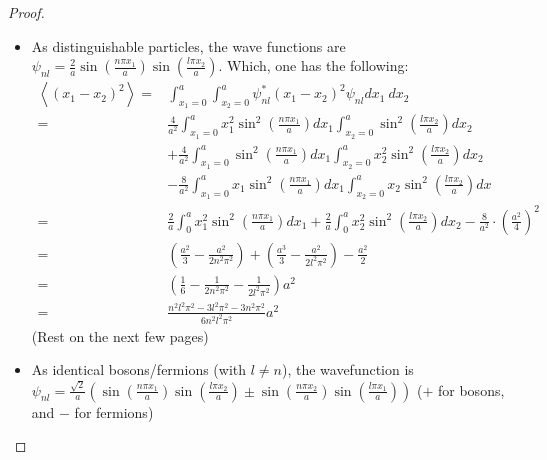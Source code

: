 \documentclass{article}
\begin{document}
\begin{proof}

    \hfil

    \begin{itemize}
        \item[(a)] As distinguishable particles, the wave functions are $\psi_{nl} = \frac{2}{a}\sin\left(\frac{n\pi x_1}{a}\right)\sin\left(\frac{l\pi x_2}{a}\right)$. Which, one has the following:
        \begin{align}
            \left<(x_1-x_2)^2\right> =& \int_{x_1=0}^a\int_{x_2=0}^a\psi_{nl}^*(x_1-x_2)^2\psi_{nl}dx_1\ dx_2\\
            =& \frac{4}{a^2}\int_{x_1=0}^ax_1^2\sin^2\left(\frac{n\pi x_1}{a}\right)dx_1\int_{x_2=0}^{a}\sin^2\left(\frac{l\pi x_2}{a}\right)dx_2\\ 
            &+ \frac{4}{a^2}\int_{x_1=0}^a\sin^2\left(\frac{n\pi x_1}{a}\right)dx_1\int_{x_2=0}^{a}x_2^2\sin^2\left(\frac{l\pi x_2}{a}\right)dx_2\\
            &- \frac{8}{a^2}\int_{x_1=0}^{a}x_1\sin^2\left(\frac{n\pi x_1}{a}\right)dx_1\int_{x_2=0}^{a}x_2\sin^2\left(\frac{l\pi x_2}{a}\right)dx\\
            =& \frac{2}{a}\int_{0}^a x_1^2\sin^2\left(\frac{n\pi x_1}{a}\right)dx_1 + \frac{2}{a}\int_{0}^{a}x_2^2\sin^2\left(\frac{l\pi x_2}{a}\right)dx_2 - \frac{8}{a^2}\cdot \left(\frac{a^2}{4}\right)^2\\
            =& \left(\frac{a^2}{3}-\frac{a^2}{2n^2\pi^2}\right)+\left(\frac{a^3}{3}-\frac{a^2}{2l^2\pi^2}\right) - \frac{a^2}{2}\\
            =&\left(\frac{1}{6}-\frac{1}{2n^2\pi^2}-\frac{1}{2l^2\pi^2}\right)a^2\\
            =& \frac{n^2l^2\pi^2 - 3l^2\pi^2-3n^2\pi^2}{6n^2l^2\pi^2}a^2
        \end{align}
        (Rest on the next few pages)

        \newpage

        \item[(b),(c)] As identical bosons/fermions (with $l\neq n$), the wavefunction is $\psi_{nl}= \frac{\sqrt{2}}{a}\left(\sin\left(\frac{n\pi x_1}{a}\right)\sin\left(\frac{l\pi x_2}{a}\right)\pm \sin\left(\frac{n\pi x_2}{a}\right)\sin\left(\frac{l\pi x_1}{a}\right)\right)$ ($+$ for bosons, and $-$ for fermions)
        

\end{itemize}
\end{proof}
\end{document}
